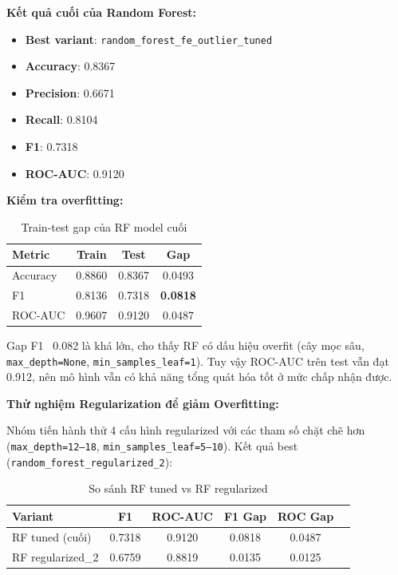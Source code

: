 \documentclass[12pt, a4paper]{article}
\begin{document}
\textbf{Kết quả cuối của Random Forest:}

\begin{itemize}
    \item \textbf{Best variant}: \texttt{random\_forest\_fe\_outlier\_tuned}
    \item \textbf{Accuracy}: 0.8367
    \item \textbf{Precision}: 0.6671
    \item \textbf{Recall}: 0.8104
    \item \textbf{F1}: 0.7318
    \item \textbf{ROC-AUC}: 0.9120
\end{itemize}

\textbf{Kiểm tra overfitting:}

\begin{table}[h!]
\centering
\caption{Train-test gap của RF model cuối}
\begin{tabular}{|l|c|c|c|}
\hline
\textbf{Metric} & \textbf{Train} & \textbf{Test} & \textbf{Gap} \\ \hline
Accuracy & 0.8860 & 0.8367 & 0.0493 \\ \hline
F1       & 0.8136 & 0.7318 & \textbf{0.0818} \\ \hline
ROC-AUC  & 0.9607 & 0.9120 & 0.0487 \\ \hline
\end{tabular}
\end{table}

Gap F1 ~0.082 là khá lớn, cho thấy RF có dấu hiệu overfit (cây mọc sâu, \texttt{max\_depth=None}, \texttt{min\_samples\_leaf=1}). Tuy vậy ROC-AUC trên test vẫn đạt 0.912, nên mô hình vẫn có khả năng tổng quát hóa tốt ở mức chấp nhận được.

\textbf{Thử nghiệm Regularization để giảm Overfitting:}

Nhóm tiến hành thử 4 cấu hình regularized với các tham số chặt chẽ hơn (\texttt{max\_depth=12--18}, \texttt{min\_samples\_leaf=5--10}). Kết quả best (\texttt{random\_forest\_regularized\_2}):

\begin{table}[h!]
\centering
\caption{So sánh RF tuned vs RF regularized}
\renewcommand{\arraystretch}{1.3}
\begin{tabular}{|l|c|c|c|c|c|}
\hline
\textbf{Variant} & \textbf{F1} & \textbf{ROC-AUC} & \textbf{F1 Gap} & \textbf{ROC Gap} \\ \hline
RF tuned (cuối)        & 0.7318 & 0.9120 & 0.0818 & 0.0487 \\ \hline
RF regularized\_2      & 0.6759 & 0.8819 & 0.0135 & 0.0125 \\ \hline
\end{tabular}
\end{table}
\end{document}
